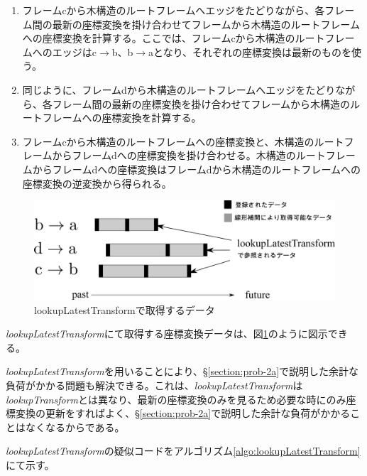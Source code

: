 \documentclass[a4paper]{jreport}	%
\begin{document}
\begin{enumerate}
	\item フレームcから木構造のルートフレームへエッジをたどりながら、各フレーム間の最新の座標変換を掛け合わせてフレームから木構造のルートフレームへの座標変換を計算する。ここでは、フレームcから木構造のルートフレームへのエッジはc$\rightarrow$b、b$\rightarrow$aとなり、それぞれの座標変換は最新のものを使う。
	\item 同じように、フレームdから木構造のルートフレームへエッジをたどりながら、各フレーム間の最新の座標変換を掛け合わせてフレームから木構造のルートフレームへの座標変換を計算する。
	\item フレームcから木構造のルートフレームへの座標変換と、木構造のルートフレームからフレームdへの座標変換を掛け合わせる。木構造のルートフレームからフレームdへの座標変換はフレームdから木構造のルートフレームへの座標変換の逆変換から得られる。
\end{enumerate}

\begin{figure}[h] 
\centering
\includegraphics[width=12cm]{lookupLatestTransform}
\caption{lookupLatestTransformで取得するデータ}
\label{fig:lookupLatestTransform}
\end{figure}

\textit{lookupLatestTransform}にて取得する座標変換データは、図\ref{fig:lookupLatestTransform}のように図示できる。

\textit{lookupLatestTransform}を用いることにより、§\ref{section:prob-2a}で説明した余計な負荷がかかる問題も解決できる。これは、\textit{lookupLatestTransform}は\textit{lookupTransform}とは異なり、最新の座標変換のみを見るため必要な時にのみ座標変換の更新をすればよく、§\ref{section:prob-2a}で説明した余計な負荷がかかることはなくなるからである。

\textit{lookupLatestTransform}の疑似コードをアルゴリズム\ref{algo:lookupLatestTransform}にて示す。
\end{document}
